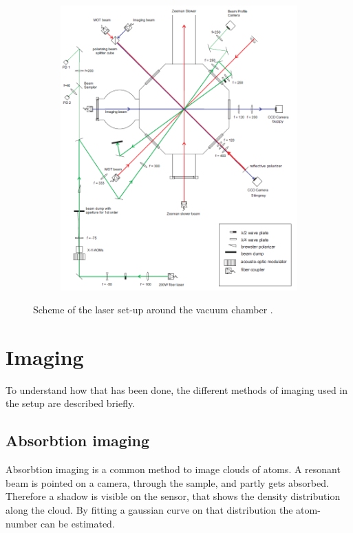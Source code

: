 \begin{figure}[h]
\centering
\begin{subfigure}[b]{0.8\textwidth}
                \includegraphics[width=\textwidth]{scheme}
\end{subfigure}
\caption{Scheme of the laser set-up around the vacuum chamber \cite{lompe}. }
\label{scheme}
\end{figure}
\section{Imaging}

To understand how that has been done, the different methods of imaging used in the setup are described briefly.

\subsection{Absorbtion imaging}

Absorbtion imaging is a common method to image clouds of atoms\cite{ketterle}. A resonant beam is pointed on a camera, through the sample, and partly gets absorbed. Therefore a shadow is visible on the sensor, that shows the density distribution along the cloud. By fitting a gaussian curve on that distribution the atom-number can be estimated.

